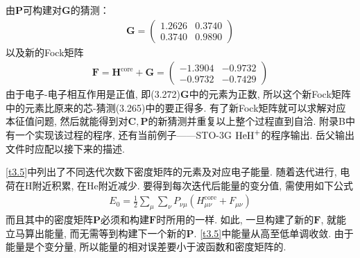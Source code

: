 {由$\mathbf{P}$可构建对$\mathbf{G}$的猜测：
\begin{align}
\mathbf{G}=\begin{pmatrix}
1.2626&0.3740\\0.3740&0.9890
\end{pmatrix}
\end{align}
以及新的Fock矩阵
\begin{align}
\mathbf{F=H}^\mathrm{core}+\mathbf{G}=
\begin{pmatrix}
-1.3904&-0.9732 \\ -0.9732&-0.7429
\end{pmatrix}
\end{align}
由于电子-电子相互作用是正值, 即(3.272)$\mathbf{G}$中的元素为正数, 所以这个新Fock矩阵中的元素比原来的芯-\ha 猜测(3.265)中的要正得多. 有了新Fock矩阵就可以求解对应本征值问题, 然后就能得到对$\mathbf{C,P}$的新猜测并重复以上整个过程直到自洽. 附录B中有一个实现该过程的程序, 还有当前例子——STO-3G $\mathrm{HeH}^+$的程序输出. 岳父输出文件时应配以接下来的描述.

\ref{t3.5}中列出了不同迭代次数下密度矩阵的元素及对应电子能量. 随着迭代进行, 电荷在$\mathrm{H}$附近积累, 在$\mathrm{He}$附近减少. 要得到每次迭代后能量的变分值, 需使用如下公式
\begin{align}
E_0 = \frac{1}{2}\sum_\mu\sum_\nu P_{\nu\mu}(H_{\mu\nu}^\mathrm{core}+F_{\mu\nu})
\end{align}
而且其中的密度矩阵$\mathbf{P}$必须和构建$\mathbf{F}$时所用的一样. 如此, 一旦构建了新的$\mathbf{F}$, 就能立马算出能量, 而无需等到构建下一个新的$\mathbf{P}$. 
\ref{t3.5}中能量从高至低单调收敛. 由于能量是个变分量, 所以能量的相对误差要小于波函数和密度矩阵的. 

}
